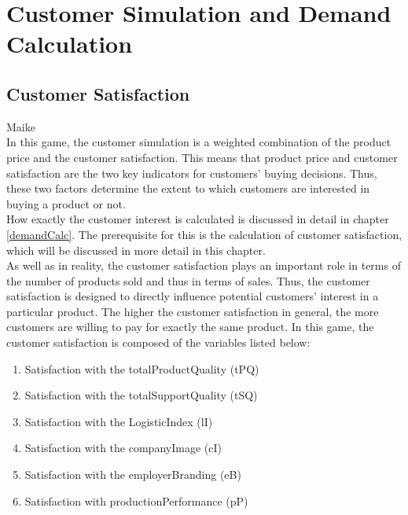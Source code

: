 \section{Customer Simulation and Demand Calculation}
\label{sec:customsim}
\subsection{Customer Satisfaction}
Maike\\
In this game, the customer simulation is a weighted combination of the product price and the customer satisfaction.
This means that product price and customer satisfaction are the two key indicators for customers' buying decisions. Thus, these two factors determine the extent to which customers are interested in buying a product or not.\\
How exactly the customer interest is calculated is discussed in detail in chapter \ref{demandCalc}. The prerequisite for this is the calculation of customer satisfaction, which will be discussed in more detail in this chapter.\\
As well as in reality, the customer satisfaction plays an important role in terms of the number of products sold and thus in terms of sales. \cite{deptolla_effects_2004}
Thus, the customer satisfaction is designed to directly influence potential customers' interest in a particular product. The higher the customer satisfaction in general, the more customers are willing to pay for exactly the same product. 
In this game, the customer satisfaction is composed of the variables listed below:
\begin{enumerate}
      \item Satisfaction with the totalProductQuality (tPQ)
      \item Satisfaction with the totalSupportQuality (tSQ)
      \item Satisfaction with the LogisticIndex (lI)
      \item Satisfaction with the companyImage (cI)
      \item Satisfaction with the employerBranding (eB)
      \item Satisfaction with productionPerformance (pP)
\end{enumerate}

